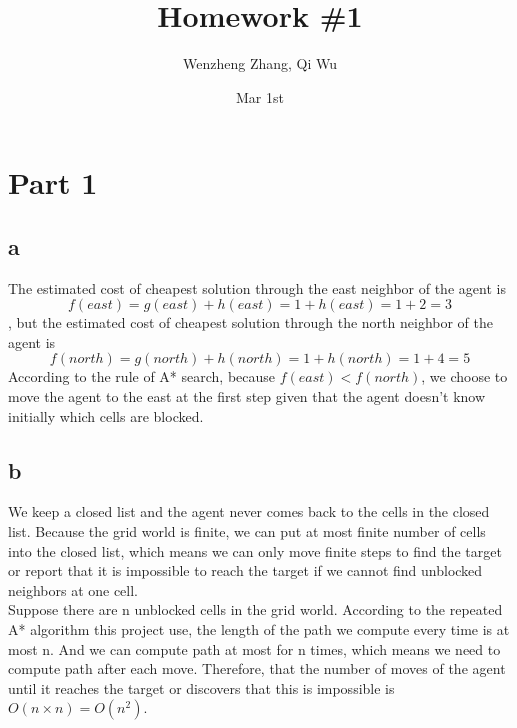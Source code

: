 \documentclass[
	12pt, %
]{fphw}
\title{Homework \#1} %
\author{Wenzheng Zhang, Qi Wu} %
\date{Mar 1st} %
\institute{rutgers university} %
\begin{document}
\maketitle %


\section*{Part 1}





\subsection*{a}
 The estimated cost of cheapest solution through the east neighbor of the agent is $$f(east)=g(east)+h(east)=1+h(east)=1+2=3$$, but the estimated cost of cheapest solution through the north neighbor of the agent is $$f(north)=g(north)+h(north)=1+h(north)=1+4=5$$ 
 According to the rule of A* search, because $f(east)<f(north)$, we choose to move the agent to  the east at the first step given that the agent doesn't know initially which cells are blocked.


\subsection*{b}
 We keep a closed list and the agent never comes back to the cells in the closed list. Because the grid world is finite, we can put at most finite number of cells  into the closed  list, which means we can only move finite steps to find the target or report that it is impossible to reach the target if we cannot find unblocked neighbors at one cell.\\
 Suppose there are n unblocked  cells in the grid world. According to the repeated A* algorithm this project use, the length of the path we compute every time is at most n. And we can compute path at most for n times, which means we  need to compute path after each move. Therefore, that the number of moves of the agent until it reaches the target or discovers that this is impossible is $O(n\times n)=O(n^2)$.
\end{document}
